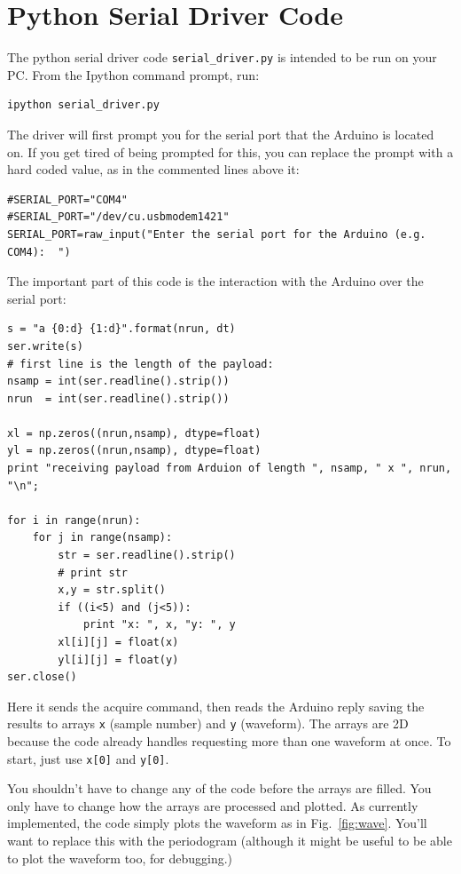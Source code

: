 \documentclass[12pt]{article}
\begin{document}
\section{Python Serial Driver Code}
The python serial driver code {\tt serial\_driver.py} is intended to be run on your PC.  From the Ipython command prompt, run:
\begin{verbatim}
ipython serial_driver.py
\end{verbatim}
The driver will first prompt you for the serial port that the Arduino is located on.  If you get tired of being prompted for this, you can replace the prompt with a hard coded value, as in the commented lines above it:
\begin{verbatim}
#SERIAL_PORT="COM4"                                                                                                     
#SERIAL_PORT="/dev/cu.usbmodem1421"                                                                                     
SERIAL_PORT=raw_input("Enter the serial port for the Arduino (e.g. COM4):  ")
\end{verbatim}
The important part of this code is the interaction with the Arduino over the serial port:
\begin{verbatim}
s = "a {0:d} {1:d}".format(nrun, dt)
ser.write(s)
# first line is the length of the payload:
nsamp = int(ser.readline().strip())
nrun  = int(ser.readline().strip())

xl = np.zeros((nrun,nsamp), dtype=float)
yl = np.zeros((nrun,nsamp), dtype=float)
print "receiving payload from Arduion of length ", nsamp, " x ", nrun, "\n";

for i in range(nrun):
    for j in range(nsamp):
        str = ser.readline().strip()
        # print str
        x,y = str.split()
        if ((i<5) and (j<5)):
            print "x: ", x, "y: ", y
        xl[i][j] = float(x)
        yl[i][j] = float(y)
ser.close()
\end{verbatim}

Here it sends the acquire command, then reads the Arduino reply saving the results to arrays {\tt x} (sample number) and {\tt y} (waveform).  The arrays are 2D because the code already handles requesting more than one waveform at once.  To start, just use {\tt x[0]} and {\tt y[0]}. 

You shouldn't have to change any of the code before the arrays are filled.  You only have to change how the arrays are processed and plotted.  As currently implemented, the code simply plots the waveform as in Fig.~\ref{fig:wave}.  You'll want to replace this with the periodogram (although it might be useful to be able to plot the waveform too, for debugging.)
  
\end{document}
